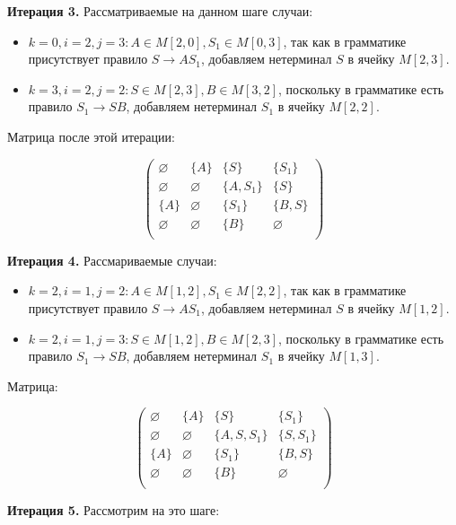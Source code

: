 \begin{example}
\textbf{Итерация 3.}
Рассматриваемые на данном шаге случаи:

\begin{itemize}
    \setlength\itemsep{1em}
    \item $k = 0, i = 2, j = 3: A \in M[2, 0], S_1 \in M[0, 3]$, так как в грамматике присутствует правило $S \to A S_1$, добавляем нетерминал $S$ в ячейку $M[2, 3]$.
    \item $k = 3, i = 2, j = 2: S \in M[2, 3], B \in M[3, 2]$, поскольку в грамматике есть правило $S_1 \to S B$, добавляем нетерминал $S_1$ в ячейку $M[2, 2]$.
\end{itemize}

Матрица после этой итерации:

\[
\begin{pmatrix}
\varnothing & \{A\}       & \{S\}      & \{S_1\}     \\
\varnothing & \varnothing & \{A, S_1\} & \{S\}       \\
\{A\}       & \varnothing & \{S_1\}    & \{B, S\}    \\
\varnothing & \varnothing & \{B\}      & \varnothing \\
\end{pmatrix}
\]

\textbf{Итерация 4.}
Рассмариваемые случаи:

\begin{itemize}
    \setlength\itemsep{1em}
    \item $k = 2, i = 1, j = 2: A \in M[1, 2], S_1 \in M[2, 2]$, так как в грамматике присутствует правило $S \to A S_1$, добавляем нетерминал $S$ в ячейку $M[1, 2]$.
    \item $k = 2, i = 1, j = 3: S \in M[1, 2], B \in M[2, 3]$, поскольку в грамматике есть правило $S_1 \to S B$, добавляем нетерминал $S_1$ в ячейку $M[1, 3]$.
\end{itemize}

Матрица:

\[
\begin{pmatrix}
\varnothing & \{A\}       & \{S\}         & \{S_1\}     \\
\varnothing & \varnothing & \{A, S, S_1\} & \{S, S_1\}  \\
\{A\}       & \varnothing & \{S_1\}       & \{B, S\}    \\
\varnothing & \varnothing & \{B\}         & \varnothing \\
\end{pmatrix}
\]

\textbf{Итерация 5.}
Рассмотрим на это шаге:


\end{example}
